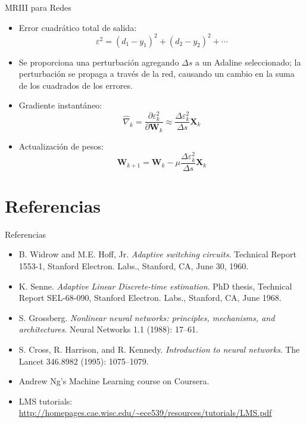 \documentclass[aspectratio=169,utf8,spanish]{beamer}
\begin{document}
\begin{frame}{MRIII para Redes}
  \begin{itemize}
    \item Error cuadrático total de salida:
    \begin{equation*}
      \varepsilon^2 = (d_1 - y_1)^2 + (d_2 - y_2)^2 + \cdots
    \end{equation*}
    \item Se proporciona una perturbación agregando $\Delta s$ a un Adaline seleccionado; la perturbación se propaga a través de la red, causando un cambio en la suma de los cuadrados de los errores.
    \item Gradiente instantáneo:
    \begin{equation*}
      \hat{\nabla}_k = \frac{\partial \varepsilon_k^2}{\partial \mathbf{W}_k}
      \approx \frac{\Delta\varepsilon_k^2}{\Delta s} \mathbf{X}_k
    \end{equation*}
    \item Actualización de pesos:
    \begin{equation*}
      \mathbf{W}_{k+1} = \mathbf{W}_k - \mu \frac{\Delta\varepsilon_k^2}{\Delta s} \mathbf{X}_k
    \end{equation*}
  \end{itemize}
\end{frame}

\section{Referencias}

\begin{frame}{Referencias}
  \footnotesize
  \begin{itemize}
    \item B. Widrow and M.E. Hoff, Jr. \textit{Adaptive switching circuits}. Technical Report 1553-1, Stanford Electron. Labs., Stanford, CA, June 30, 1960.
    \item K. Senne. \textit{Adaptive Linear Discrete-time estimation}. PhD thesis, Technical Report SEL-68-090, Stanford Electron. Labs., Stanford, CA, June 1968.
    \item S. Grossberg. \textit{Nonlinear neural networks: principles, mechanisms, and architectures}. Neural Networks 1.1 (1988): 17--61.
    \item S. Cross, R. Harrison, and R. Kennedy. \textit{Introduction to neural networks}. The Lancet 346.8982 (1995): 1075--1079.
    \item Andrew Ng's Machine Learning course on Coursera.
    \item LMS tutorials: \url{http://homepages.cae.wisc.edu/~ece539/resources/tutorials/LMS.pdf}
  \end{itemize}
\end{frame}
\end{document}

